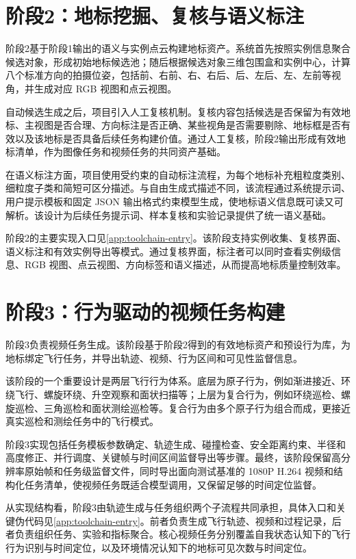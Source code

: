 \section{阶段2：地标挖掘、复核与语义标注}

阶段2基于阶段1输出的语义与实例点云构建地标资产。系统首先按照实例信息聚合候选对象，形成初始地标候选池；随后根据候选对象三维包围盒和实例中心，计算八个标准方向的拍摄位姿，包括前、右前、右、右后、后、左后、左、左前等视角，并生成对应 RGB 视图和点云视图。

自动候选生成之后，项目引入人工复核机制。复核内容包括候选是否保留为有效地标、主视图是否合理、方向标注是否正确、某些视角是否需要剔除、地标框是否有效以及该地标是否具备后续任务构建价值。通过人工复核，阶段2输出形成有效地标清单，作为图像任务和视频任务的共同资产基础。

在语义标注方面，项目使用受约束的自动标注流程，为每个地标补充粗粒度类别、细粒度子类和简短可区分描述。与自由生成式描述不同，该流程通过系统提示词、用户提示模板和固定 JSON 输出格式约束模型生成，使地标语义信息既可读又可解析。该设计为后续任务提示词、样本复核和实验记录提供了统一语义基础。

阶段2的主要实现入口见\autoref{app:toolchain-entry}。该阶段支持实例收集、复核界面、语义标注和有效实例导出等模式。通过复核界面，标注者可以同时查看实例级信息、RGB 视图、点云视图、方向标签和语义描述，从而提高地标质量控制效率。

\section{阶段3：行为驱动的视频任务构建}

阶段3负责视频任务生成。该阶段基于阶段2得到的有效地标资产和预设行为库，为地标绑定飞行任务，并导出轨迹、视频、行为区间和可见性监督信息。

该阶段的一个重要设计是两层飞行行为体系。底层为原子行为，例如渐进接近、环绕飞行、螺旋环绕、升空观察和面状扫描等；上层为复合行为，例如环绕巡检、螺旋巡检、三角巡检和面状测绘巡检等。复合行为由多个原子行为组合而成，更接近真实巡检和测绘任务中的飞行模式。

阶段3实现包括任务模板参数确定、轨迹生成、碰撞检查、安全距离约束、半径和高度修正、并行调度、关键帧与时间区间监督导出等步骤。最终，该阶段保留高分辨率原始帧和任务级监督文件，同时导出面向测试基准的 1080P H.264 视频和结构化任务清单，使视频任务既适合模型调用，又保留足够的时间定位监督。

从实现结构看，阶段3由轨迹生成与任务组织两个子流程共同承担，具体入口和关键伪代码见\autoref{app:toolchain-entry}。前者负责生成飞行轨迹、视频和过程记录，后者负责组织任务、实验和指标聚合。核心视频任务分别覆盖自我状态认知下的飞行行为识别与时间定位，以及环境情况认知下的地标可见次数与时间定位。

